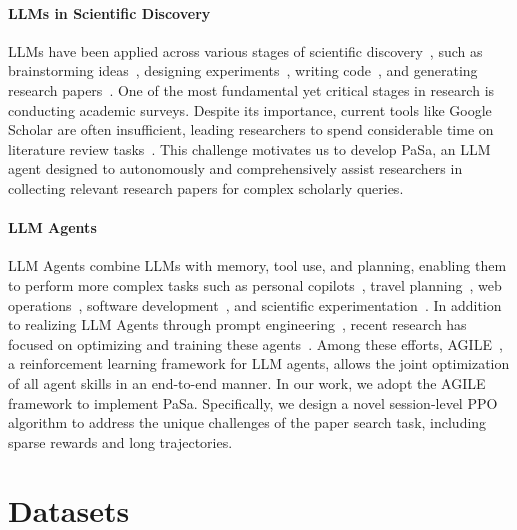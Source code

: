 \paragraph{LLMs in Scientific Discovery}

LLMs have been applied across various stages of scientific discovery~\cite{van2023ai,lu2024ai,messeri2024artificial,liao2024llms}, such as brainstorming ideas~\cite{girotra2023ideas,wang-etal-2024-scimon,baek2024researchagent}, designing experiments~\cite{m2024augmenting}, writing code~\cite{xu2022systematic}, and generating research papers~\cite{shao-etal-2024-assisting,agarwal2024litllm,wang2024autosurvey}. One of the most fundamental yet critical stages in research is conducting academic surveys. Despite its importance, current tools like Google Scholar are often insufficient, leading researchers to spend considerable time on literature review tasks~\cite{kingsley2011not,gusenbauer2021every,gusenbauer2020academic}. This challenge motivates us to develop PaSa, an LLM agent designed to autonomously and comprehensively assist researchers in collecting relevant research papers for complex scholarly queries.

\paragraph{LLM Agents}
LLM Agents combine LLMs with memory, tool use, and planning, enabling them to perform more complex tasks such as personal copilots~\citep{stratton2024introduction}, travel planning~\citep{gundawar2024robust}, web operations~\citep{deng2024mind2web}, software development~\citep{qian2023communicative}, and scientific experimentation~\citep{bran2023chemcrow}. In addition to realizing LLM Agents through prompt engineering~\cite{park2023generative,yao2023react,shinn2024reflexion,chen2023autoagents}, recent research has focused on optimizing and training these agents~\cite{feng2024agile,putta2024agent,liu2023reason}. Among these efforts, AGILE~\cite{feng2024agile}, a reinforcement learning framework for LLM agents, allows the joint optimization of all agent skills in an end-to-end manner. In our work, we adopt the AGILE framework to implement PaSa. Specifically, we design a novel session-level PPO algorithm to address the unique challenges of the paper search task, including sparse rewards and long trajectories.

\section{Datasets}


